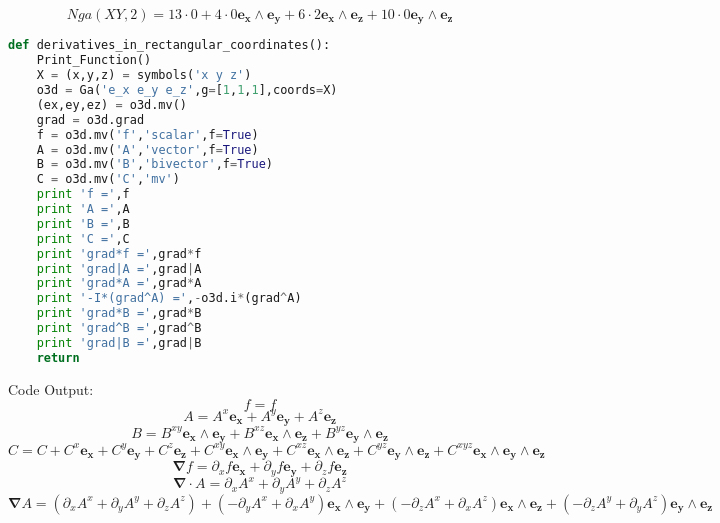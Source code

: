 \documentclass[10pt,fleqn]{report}
\begin{document}
\begin{equation*} Nga(X Y,2) = 13 \cdot 0  + 4 \cdot 0 \boldsymbol{e_{x}\wedge e_{y}} + 6 \cdot 2 \boldsymbol{e_{x}\wedge e_{z}} + 10 \cdot 0 \boldsymbol{e_{y}\wedge e_{z}} \end{equation*}
\begin{lstlisting}[language=Python,showspaces=false,showstringspaces=false,backgroundcolor=\color{gray},frame=single]
def derivatives_in_rectangular_coordinates():
    Print_Function()
    X = (x,y,z) = symbols('x y z')
    o3d = Ga('e_x e_y e_z',g=[1,1,1],coords=X)
    (ex,ey,ez) = o3d.mv()
    grad = o3d.grad
    f = o3d.mv('f','scalar',f=True)
    A = o3d.mv('A','vector',f=True)
    B = o3d.mv('B','bivector',f=True)
    C = o3d.mv('C','mv')
    print 'f =',f
    print 'A =',A
    print 'B =',B
    print 'C =',C
    print 'grad*f =',grad*f
    print 'grad|A =',grad|A
    print 'grad*A =',grad*A
    print '-I*(grad^A) =',-o3d.i*(grad^A)
    print 'grad*B =',grad*B
    print 'grad^B =',grad^B
    print 'grad|B =',grad|B
    return
\end{lstlisting}
Code Output:
\begin{equation*} f = f \end{equation*}
\begin{equation*} A = A^{x}  \boldsymbol{e_{x}} + A^{y}  \boldsymbol{e_{y}} + A^{z}  \boldsymbol{e_{z}} \end{equation*}
\begin{equation*} B = B^{xy}  \boldsymbol{e_{x}\wedge e_{y}} + B^{xz}  \boldsymbol{e_{x}\wedge e_{z}} + B^{yz}  \boldsymbol{e_{y}\wedge e_{z}} \end{equation*}
\begin{equation*} C = C  + C^{x} \boldsymbol{e_{x}} + C^{y} \boldsymbol{e_{y}} + C^{z} \boldsymbol{e_{z}} + C^{xy} \boldsymbol{e_{x}\wedge e_{y}} + C^{xz} \boldsymbol{e_{x}\wedge e_{z}} + C^{yz} \boldsymbol{e_{y}\wedge e_{z}} + C^{xyz} \boldsymbol{e_{x}\wedge e_{y}\wedge e_{z}} \end{equation*}
\begin{equation*} \boldsymbol{\nabla}  f = \partial_{x} f  \boldsymbol{e_{x}} + \partial_{y} f  \boldsymbol{e_{y}} + \partial_{z} f  \boldsymbol{e_{z}} \end{equation*}
\begin{equation*} \boldsymbol{\nabla} \cdot A = \partial_{x} A^{x}  + \partial_{y} A^{y}  + \partial_{z} A^{z} \end{equation*}
\begin{equation*} \boldsymbol{\nabla}  A = \left ( \partial_{x} A^{x}  + \partial_{y} A^{y}  + \partial_{z} A^{z} \right )  + \left ( - \partial_{y} A^{x}  + \partial_{x} A^{y} \right ) \boldsymbol{e_{x}\wedge e_{y}} + \left ( - \partial_{z} A^{x}  + \partial_{x} A^{z} \right ) \boldsymbol{e_{x}\wedge e_{z}} + \left ( - \partial_{z} A^{y}  + \partial_{y} A^{z} \right ) \boldsymbol{e_{y}\wedge e_{z}} \end{equation*}
\end{document}
